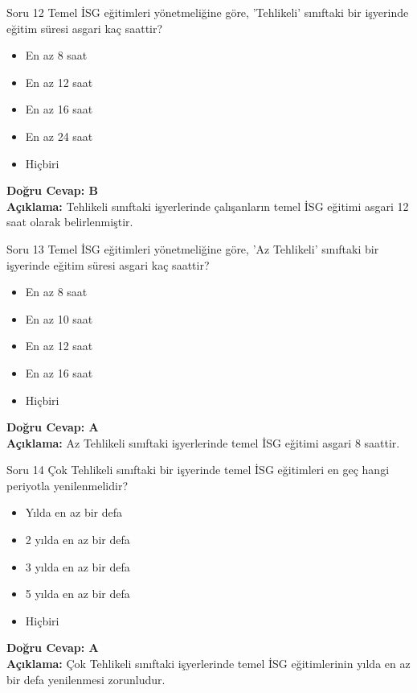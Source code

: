 \documentclass[12pt,a4paper]{article}
\begin{document}
\begin{testcard}{Soru 12}
    Temel İSG eğitimleri yönetmeliğine göre, 'Tehlikeli' sınıftaki bir işyerinde eğitim süresi asgari kaç saattir?
    \begin{itemize}
        \item[A)] En az 8 saat
        \item[B)] En az 12 saat
        \item[C)] En az 16 saat
        \item[D)] En az 24 saat
        \item[E)] Hiçbiri
    \end{itemize}
    \tcblower
    \textbf{Doğru Cevap: B} \\
    \textbf{Açıklama:} Tehlikeli sınıftaki işyerlerinde çalışanların temel İSG eğitimi asgari 12 saat olarak belirlenmiştir.
\end{testcard}

\begin{testcard}{Soru 13}
    Temel İSG eğitimleri yönetmeliğine göre, 'Az Tehlikeli' sınıftaki bir işyerinde eğitim süresi asgari kaç saattir?
    \begin{itemize}
        \item[A)] En az 8 saat
        \item[B)] En az 10 saat
        \item[C)] En az 12 saat
        \item[D)] En az 16 saat
        \item[E)] Hiçbiri
    \end{itemize}
    \tcblower
    \textbf{Doğru Cevap: A} \\
    \textbf{Açıklama:} Az Tehlikeli sınıftaki işyerlerinde temel İSG eğitimi asgari 8 saattir.
\end{testcard}

\begin{testcard}{Soru 14}
    Çok Tehlikeli sınıftaki bir işyerinde temel İSG eğitimleri en geç hangi periyotla yenilenmelidir?
    \begin{itemize}
        \item[A)] Yılda en az bir defa
        \item[B)] 2 yılda en az bir defa
        \item[C)] 3 yılda en az bir defa
        \item[D)] 5 yılda en az bir defa
        \item[E)] Hiçbiri
    \end{itemize}
    \tcblower
    \textbf{Doğru Cevap: A} \\
    \textbf{Açıklama:} Çok Tehlikeli sınıftaki işyerlerinde temel İSG eğitimlerinin yılda en az bir defa yenilenmesi zorunludur.
\end{testcard}
\end{document}
